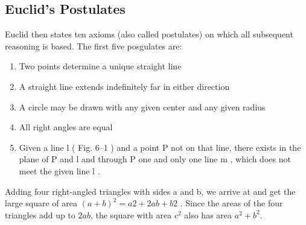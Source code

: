 \subsection{Euclid's Postulates}
Euclid then states ten axioms (also called postulates) on which all subsequent reasoning is based. The first five posgulates are:
\begin{enumerate}
    \item Two points determine a unique straight line
    \item A straight line extends indefinitely far in either direction
    \item A circle may be drawn with any given center and any given radius
    \item All right angles are equal
    \item Given a line l ( Fig. 6–1 ) and a point P not on that line, there exists in the plane of P and l and through P one and only one line m , which does not meet the given line l .
\end{enumerate}





Adding four right-angled triangles with sides a and b, we arrive at and get the large square of area $(a + b)^2 = a 2 + 2ab + b 2$ . Since the areas of the four triangles add up to $2ab$, the square with area $c^2$ also has area $a^2 + b^2$.

